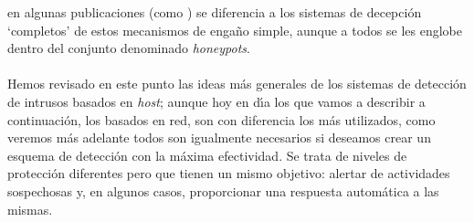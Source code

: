 en algunas publicaciones (como \cite{kn:gra00}) se diferencia a los sistemas de 
decepci\'on `completos'
de estos mecanismos de enga\~no simple, aunque a todos se les englobe dentro
del conjunto denominado {\it honeypots}.\\
\\Hemos revisado en este punto las ideas m\'as generales de los sistemas de
detecci\'on de intrusos basados en {\it host}; aunque hoy en d\'{\i}a los que 
vamos a describir a continuaci\'on, los basados en red, son con diferencia los 
m\'as utilizados, como veremos m\'as adelante todos son igualmente 
ne\-ce\-sa\-rios
si deseamos crear un esquema de detecci\'on con la m\'axima efectividad. Se
trata de niveles de protecci\'on diferentes pero que tienen un mismo objetivo:
alertar de actividades sospechosas y, en algunos casos, proporcionar una 
respuesta autom\'atica a las mismas.
